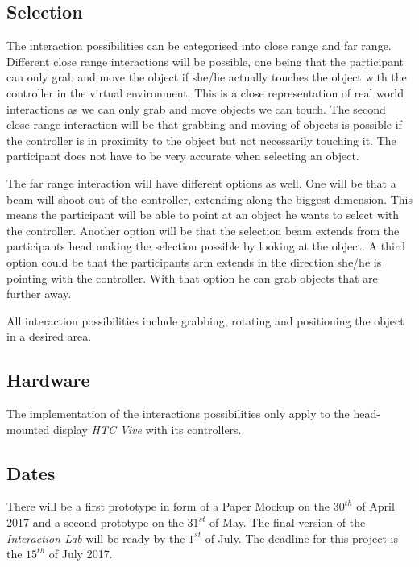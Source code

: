 \documentclass[a4paper, 12pt]{article}
\begin{document}
\subsection{Selection}
The interaction possibilities can be categorised into close range and far range. Different close range interactions will be possible, one being that the participant can only grab and move the object if she/he actually touches the object with the controller in the virtual environment. This is a close representation of real world interactions as we can only grab and move objects we can touch. 
The second close range interaction will be that grabbing and moving of objects is possible if the controller is in proximity to the object but not necessarily touching it. The participant does not have to be very accurate when selecting an object. 

The far range interaction will have different options as well. One will be that a beam will shoot out of the controller, extending along the biggest dimension. This means the participant will be able to point at an object he wants to select with the controller. 
Another option will be that the selection beam extends from the participants head making the selection possible by looking at the object. 
A third option could be that the participants arm extends in the direction she/he is pointing with the controller. With that option he can grab objects that are further away. 

All interaction possibilities include grabbing, rotating and positioning the object in a desired area.  

\subsection{Hardware}

The implementation of the interactions possibilities only apply to the head-mounted display \textit{HTC Vive} with its controllers. 

\subsection{Dates}
There will be a first prototype in form of a Paper Mockup on the $30^{th}$ of April 2017 and a second prototype on the $31^{st}$ of May. 
The final version of the \textit{Interaction Lab} will be ready by the $1^{st}$ of July. The deadline for this project is the $15^{th}$ of July 2017.
\end{document}
